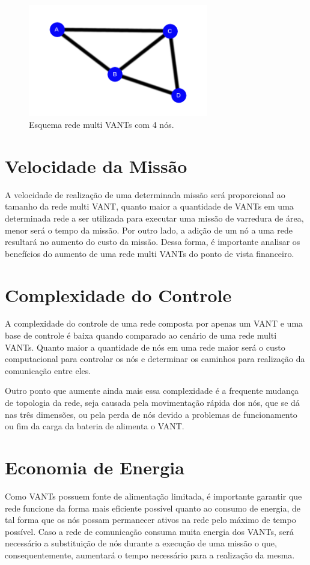 \begin{figure} 
\center
\includegraphics[width=0.7\textwidth]{perdaNo.png}
\caption{Esquema rede multi VANTs com 4 nós.} 
\label{fig:perdaNo}
\end{figure} 

\section{Velocidade da Missão}

A velocidade de realização de uma determinada missão será proporcional ao tamanho da rede multi VANT, quanto maior a quantidade de VANTs em uma determinada rede a ser utilizada para executar uma missão de varredura de área, menor será o tempo da missão. Por outro lado, a adição de um nó a uma rede resultará no aumento do custo da missão. Dessa forma, é importante analisar os benefícios do aumento de uma rede multi VANTs do ponto de vista financeiro. 

\section{Complexidade do Controle}

A complexidade do controle de uma rede composta por apenas um VANT e uma base de controle é baixa quando comparado ao cenário de uma rede multi VANTs. Quanto maior a quantidade de nós em uma rede maior será o custo computacional para controlar os nós e determinar os caminhos para realização da comunicação entre eles.

Outro ponto que aumente ainda mais essa complexidade é a frequente mudança de topologia da rede, seja causada pela movimentação rápida dos nós, que se dá nas três dimensões, ou pela perda de nós devido a problemas de funcionamento ou fim da carga da bateria de alimenta o VANT.

\section{Economia de Energia}

Como VANTs possuem fonte de alimentação limitada, é importante garantir que rede funcione da forma mais eficiente possível quanto ao consumo de energia, de tal forma que os nós possam permanecer ativos na rede pelo máximo de tempo possível. Caso a rede de comunicação consuma muita energia dos VANTs, será necessário a substituição de nós durante a execução de uma missão o que, consequentemente, aumentará o tempo necessário para a realização da mesma. 